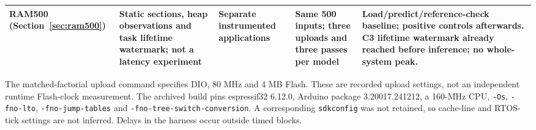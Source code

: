 \begin{table}[t]
\begin{tabular}{p{2.0cm}p{3.2cm}p{2.5cm}p{3.5cm}p{5.3cm}}
RAM500 (Section~\ref{sec:ram500}) & Static sections, heap observations and task lifetime watermark; not a latency experiment & Separate instrumented applications & Same 500 inputs; three uploads and three passes per model & Load/predict/reference-check baseline; positive controls afterwards. C3 lifetime watermark already reached before inference; no whole-system peak.\\
\bottomrule
\end{tabular}
\end{table}

The matched-factorial upload command specifies DIO, 80 MHz and 4 MB Flash. These are recorded upload settings, not an independent runtime Flash-clock measurement. The archived build pins espressif32 6.12.0, Arduino package 3.20017.241212, a 160-MHz CPU, \texttt{-Os}, \texttt{-fno-lto}, \texttt{-fno-jump-tables} and \texttt{-fno-tree-}\allowbreak\texttt{switch-conversion}. A corresponding \texttt{sdkconfig} was not retained, so cache-line and RTOS-tick settings are not inferred. Delays in the harness occur outside timed blocks.
